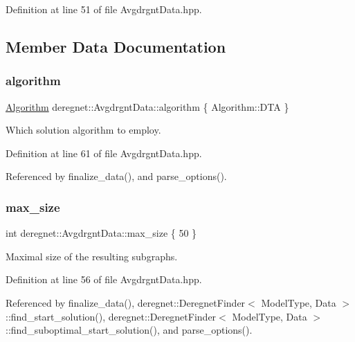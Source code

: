 Definition at line 51 of file Avgdrgnt\+Data.\+hpp.



\subsection{Member Data Documentation}
\mbox{\label{classderegnet_1_1AvgdrgntData_aa75d6acc2d63aa589651c705eaf89280}} 
\subsubsection{\texorpdfstring{algorithm}{algorithm}}
{\footnotesize\ttfamily \hyperlink{namespacederegnet_ad59156f873b7ab02d384164b900cd874}{Algorithm} deregnet\+::\+Avgdrgnt\+Data\+::algorithm \{ Algorithm\+::\+D\+TA \}}



Which solution algorithm to employ. 



Definition at line 61 of file Avgdrgnt\+Data.\+hpp.



Referenced by finalize\+\_\+data(), and parse\+\_\+options().

\mbox{\label{classderegnet_1_1AvgdrgntData_a9e844158e12d5e1c4d519c492cffeb17}} 
\subsubsection{\texorpdfstring{max\+\_\+size}{max\_size}}
{\footnotesize\ttfamily int deregnet\+::\+Avgdrgnt\+Data\+::max\+\_\+size \{ 50 \}}



Maximal size of the resulting subgraphs. 



Definition at line 56 of file Avgdrgnt\+Data.\+hpp.



Referenced by finalize\+\_\+data(), deregnet\+::\+Deregnet\+Finder$<$ Model\+Type, Data $>$\+::find\+\_\+start\+\_\+solution(), deregnet\+::\+Deregnet\+Finder$<$ Model\+Type, Data $>$\+::find\+\_\+suboptimal\+\_\+start\+\_\+solution(), and parse\+\_\+options().


